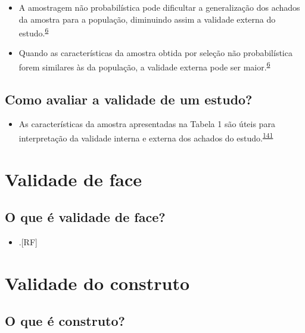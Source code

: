\documentclass[
  a4paper,
]{book}
\providecommand{\tightlist}{%
  \setlength{\itemsep}{0pt}\setlength{\parskip}{0pt}}
\begin{document}
\begin{itemize}
\item
  A amostragem não probabilística pode dificultar a generalização dos achados da amostra para a população, diminuindo assim a validade externa do estudo.\textsuperscript{\protect\hyperlink{ref-Banerjee2010}{6}}
\item
  Quando as características da amostra obtida por seleção não probabilística forem similares às da população, a validade externa pode ser maior.\textsuperscript{\protect\hyperlink{ref-Banerjee2010}{6}}
\end{itemize}

\hypertarget{como-avaliar-a-validade-de-um-estudo}{%
\subsection{Como avaliar a validade de um estudo?}\label{como-avaliar-a-validade-de-um-estudo}}

\begin{itemize}
\tightlist
\item
  As características da amostra apresentadas na Tabela 1 são úteis para interpretação da validade interna e externa dos achados do estudo.\textsuperscript{\protect\hyperlink{ref-Westreich2013}{141}}
\end{itemize}

\hypertarget{validade-face}{%
\section{Validade de face}\label{validade-face}}

\hypertarget{o-que-uxe9-validade-de-face}{%
\subsection{O que é validade de face?}\label{o-que-uxe9-validade-de-face}}

\begin{itemize}
\tightlist
\item
  .{[}RF{]}
\end{itemize}

\hypertarget{validade-constructo}{%
\section{Validade do construto}\label{validade-constructo}}

\hypertarget{o-que-uxe9-construto}{%
\subsection{O que é construto?}\label{o-que-uxe9-construto}}
\end{document}
